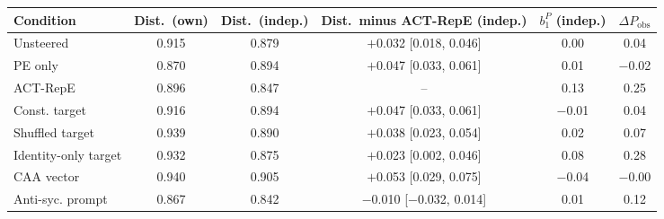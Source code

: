 \begin{tabular}{lccccc}
\toprule
Condition & Dist.\ (own) & Dist.\ (indep.) & Dist.\ minus ACT-RepE (indep.) & $b_1^P$ (indep.) & $\Delta P_{\mathrm{obs}}$ \\
\midrule
Unsteered & 0.915 & 0.879 & $+$0.032 [0.018, 0.046] & 0.00 & 0.04 \\
PE only & 0.870 & 0.894 & $+$0.047 [0.033, 0.061] & 0.01 & $-$0.02 \\
ACT-RepE & 0.896 & 0.847 & -- & 0.13 & 0.25 \\
Const. target & 0.916 & 0.894 & $+$0.047 [0.033, 0.061] & $-$0.01 & 0.04 \\
Shuffled target & 0.939 & 0.890 & $+$0.038 [0.023, 0.054] & 0.02 & 0.07 \\
Identity-only target & 0.932 & 0.875 & $+$0.023 [0.002, 0.046] & 0.08 & 0.28 \\
CAA vector & 0.940 & 0.905 & $+$0.053 [0.029, 0.075] & $-$0.04 & $-$0.00 \\
Anti-syc. prompt & 0.867 & 0.842 & $-$0.010 [$-$0.032, 0.014] & 0.01 & 0.12 \\
\bottomrule
\end{tabular}
